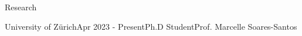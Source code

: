 \documentclass{resume} %
\begin{document}
\begin{rSection}{Research}
\begin{rSubsection}{University of Zürich}{Apr 2023 - Present}{Ph.D Student}{Prof. Marcelle Soares-Santos}



\end{rSubsection}




\end{rSection}
\end{document}
